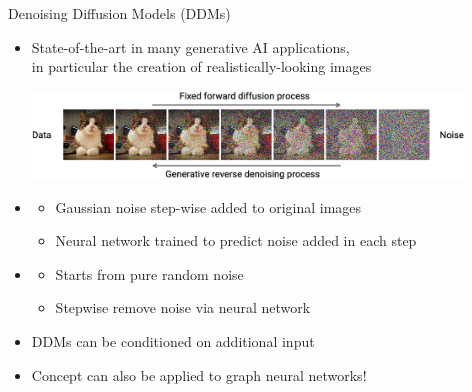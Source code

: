 \documentclass[aspectratio=1610]{beamer}
\newcommand{\important}[1]{{\color{green!60!black}#1}}
\begin{document}
\begin{frame}{Denoising Diffusion Models (DDMs)}
\begin{itemize}
	\item State-of-the-art in many generative AI applications,\\
	in particular the creation of realistically-looking images

	\medskip
	\includegraphics[width=0.9\textwidth]{graphics/diffusion.png}

	\bigskip
	\item {}
	\begin{itemize}
		\item Gaussian noise step-wise added to original images
		\item Neural network trained to predict noise added in each step
	\end{itemize}
	\item {}
	\begin{itemize}
		\item Starts from pure random noise
		\item Stepwise remove noise via neural network
	\end{itemize}
	\item DDMs can be conditioned on additional input
	\item \important{Concept can also be applied to graph neural networks!}
\end{itemize}
\end{frame}
\end{document}
